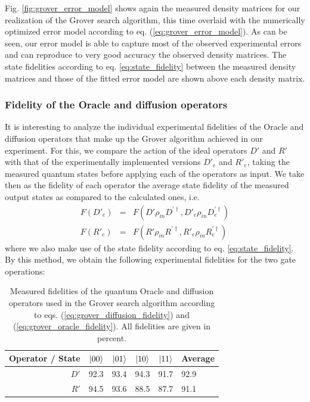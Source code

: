 \smallskip

Fig. \ref{fig:grover_error_model} shows again the measured density matrices for our realization of the Grover search algorithm, this time overlaid with the numerically optimized error model according to eq. (\ref{eq:grover_error_model}). As can be seen, our error model is able to capture most of the observed experimental errors and can reproduce to very good accuracy the observed density matrices. The state fidelities according to eq. \ref{eq:state_fidelity} between the measured density matrices and those of the fitted error model are shown above each density matrix.

\subsubsection{Fidelity of the Oracle and diffusion operators}

It is interesting to analyze the individual experimental fidelities of the Oracle and diffusion operators that make up the Grover algorithm achieved in our experiment. For this, we compare the action of the ideal operators $D'$ and $R'$ with that of the experimentally implemented versions $D'_{e}$ and $R'_{e}$, taking the measured quantum states before applying each of the operators as input. We take then as the fidelity of each operator the average state fidelity of the measured output states as compared to the calculated ones, i.e.
%
\begin{eqnarray}
F(D'_{e}) & = & F(D'\rho_{in}D^{'\dagger},D'_e \rho_{in} D_{e}^{'\dagger}) \label{eq:grover_diffusion_fidelity} \\
F(R'_{e}) & = & F(R'\rho_{in}R^{'\dagger},R'_e \rho_{in} R_{e}^{'\dagger}) \label{eq:grover_oracle_fidelity}
\end{eqnarray}
%
where we also make use of the state fidelity according to eq. \ref{eq:state_fidelity}. By this method, we obtain the following experimental fidelities for the two gate operations:

\begin{table}[ht!]
\centering
\begin{tabular}{r|rrrr|l}
Operator / State & $\left| 00 \right>$ & $\left| 01 \right>$ & $\left| 10 \right>$ & $\left| 11 \right>$ & Average \\ \hline 
$D'$ & 92.3 & 93.4 & 94.3 & 91.7 & 92.9 \\
$R'$ & 94.5 & 93.6 & 88.5 & 87.7 & 91.1
\end{tabular}
\caption[Measured fidelities of the quantum Oracle and diffusion operators used in the Grover search algorithm]{Measured fidelities of the quantum Oracle and diffusion operators used in the Grover search algorithm according to eqs. (\ref{eq:grover_diffusion_fidelity}) and (\ref{eq:grover_oracle_fidelity}). All fidelities are given in percent.}
\end{table}

